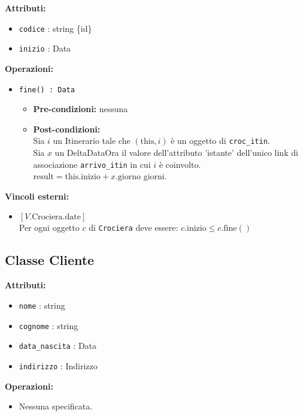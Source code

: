 \documentclass[a4paper]{scrartcl}
\begin{document}
\textbf{Attributi:}
\begin{itemize}
    \item \texttt{codice} : string \{id\}
    \item \texttt{inizio} : Data
\end{itemize}

\textbf{Operazioni:}
\begin{itemize}
    \item \texttt{fine() : Data}
    \begin{itemize}
        \item \textbf{Pre-condizioni:} nessuna
        \item \textbf{Post-condizioni:} \\
        Sia $i$ un Itinerario tale che $(\text{this}, i)$ è un oggetto di \texttt{croc\_itin}. \\
        Sia $x$ un DeltaDataOra il valore dell'attributo 'istante' dell'unico link di associazione \texttt{arrivo\_itin} in cui $i$ è coinvolto. \\
        $\text{result} = \text{this.inizio} + x.\text{giorno}$ giorni.
    \end{itemize}
\end{itemize}

\textbf{Vincoli esterni:}
\begin{itemize}
    \item $[V.\text{Crociera.date}]$ \\
    Per ogni oggetto $c$ di \texttt{Crociera} deve essere: $c.\text{inizio} \leq c.\text{fine}()$
\end{itemize}


\subsection{Classe Cliente}

\textbf{Attributi:}
\begin{itemize}
    \item \texttt{nome} : string
    \item \texttt{cognome} : string
    \item \texttt{data\_nascita} : Data
    \item \texttt{indirizzo} : Indirizzo
\end{itemize}

\textbf{Operazioni:}
\begin{itemize}
    \item Nessuna specificata.
\end{itemize}
\end{document}
